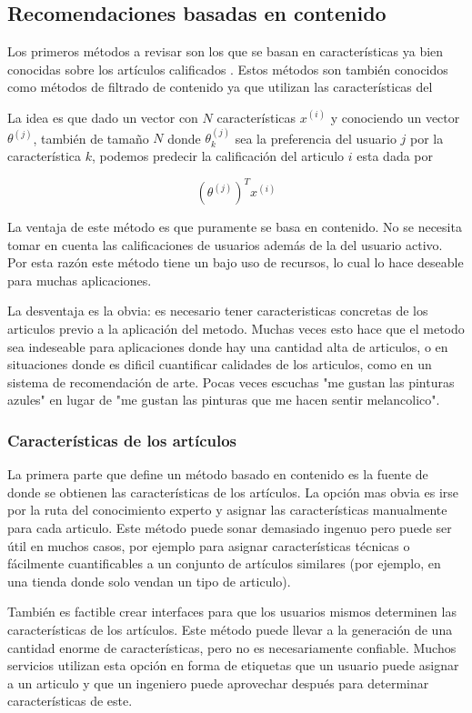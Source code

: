 \documentclass[11pt]{article}
\begin{document}
\subsection{Recomendaciones basadas en contenido} %

Los primeros métodos a revisar son los que se basan en características ya bien
conocidas sobre los artículos calificados \cite{contentbased}. Estos métodos son
también conocidos como métodos de filtrado de contenido ya que utilizan las
características del

La idea es que dado un vector con $N$ características $x^{(i)}$ y conociendo un
vector $\theta^(j)$, también de tamaño $N$ donde $\theta_k^{(j)}$ sea la
preferencia del usuario $j$ por la característica $k$, podemos predecir la
calificación del articulo $i$ esta dada por

$$(\theta^{(j)})^Tx^{(i)}$$

La ventaja de este método es que puramente se basa en contenido. No se necesita
tomar en cuenta las calificaciones de usuarios además de la del usuario activo.
Por esta razón este método tiene un bajo uso de recursos, lo cual lo hace
deseable para muchas aplicaciones.

La desventaja es la obvia: es necesario tener caracteristicas concretas de los
articulos previo a la aplicación del metodo. Muchas veces esto hace que el
metodo sea indeseable para aplicaciones donde hay una cantidad alta de
articulos, o en situaciones donde es dificil cuantificar calidades de los
articulos, como en un sistema de recomendación de arte. Pocas veces escuchas "me
gustan las pinturas azules" en lugar de "me gustan las pinturas que me hacen
sentir melancolico".

\subsubsection{Características de los artículos}

La primera parte que define un método basado en contenido es la fuente de donde
se obtienen las características de los artículos. La opción mas obvia es irse
por la ruta del conocimiento experto y asignar las características manualmente
para cada articulo. Este método puede sonar demasiado ingenuo pero puede ser
útil en muchos casos, por ejemplo para asignar características técnicas o
fácilmente cuantificables a un conjunto de artículos similares (por ejemplo, en
una tienda donde solo vendan un tipo de articulo).

También es factible crear interfaces para que los usuarios mismos determinen las
características de los artículos. Este método puede llevar a la generación de
una cantidad enorme de características, pero no es necesariamente confiable.
Muchos servicios utilizan esta opción en forma de etiquetas que un usuario puede
asignar a un articulo y que un ingeniero puede aprovechar después para
determinar características de este.
\end{document}
